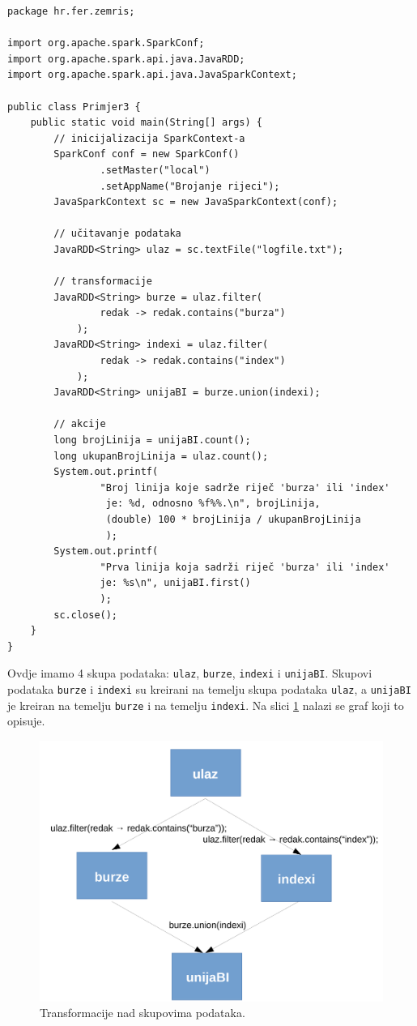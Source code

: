 \documentclass[times, utf8, zavrsni, numeric]{fer}
\begin{document}
\vspace{5mm}
\begin{lstlisting}[label={lst:primjer3}, caption={Korištenje transformacija i akcija.}]
package hr.fer.zemris;

import org.apache.spark.SparkConf;
import org.apache.spark.api.java.JavaRDD;
import org.apache.spark.api.java.JavaSparkContext;

public class Primjer3 {
	public static void main(String[] args) {
		// inicijalizacija SparkContext-a
		SparkConf conf = new SparkConf()
				.setMaster("local")
				.setAppName("Brojanje rijeci");
		JavaSparkContext sc = new JavaSparkContext(conf);

		// učitavanje podataka
		JavaRDD<String> ulaz = sc.textFile("logfile.txt");

		// transformacije
		JavaRDD<String> burze = ulaz.filter(
				redak -> redak.contains("burza")
			);
		JavaRDD<String> indexi = ulaz.filter(
				redak -> redak.contains("index")
			);
		JavaRDD<String> unijaBI = burze.union(indexi);

		// akcije
		long brojLinija = unijaBI.count();
		long ukupanBrojLinija = ulaz.count();
		System.out.printf(
				"Broj linija koje sadrže riječ 'burza' ili 'index'
				 je: %d, odnosno %f%%.\n", brojLinija,
				 (double) 100 * brojLinija / ukupanBrojLinija
				 );
		System.out.printf(
				"Prva linija koja sadrži riječ 'burza' ili 'index'
				je: %s\n", unijaBI.first()
				);
		sc.close();
	}
}
\end{lstlisting}
\vspace{5mm}

Ovdje imamo 4 skupa podataka: \texttt{ulaz}, \texttt{burze}, \texttt{indexi} i \texttt{unijaBI}. Skupovi podataka \texttt{burze} i \texttt{indexi} su kreirani na temelju skupa podataka \texttt{ulaz}, a \texttt{unijaBI} je kreiran na temelju \texttt{burze} i na temelju \texttt{indexi}. Na slici \ref{fig:burzeUnijaIndexiRDD} nalazi se graf koji to opisuje.

\begin{figure}[htb]
\centering
\includegraphics[scale = 0.8]{img/transformacijeCropped.pdf}
\caption{Transformacije nad skupovima podataka.}
\label{fig:burzeUnijaIndexiRDD}
\end{figure}
\end{document}
